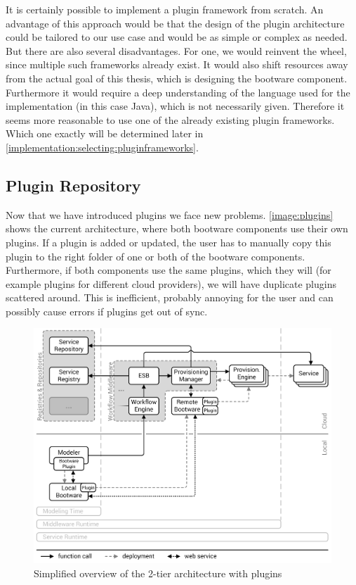 It is certainly possible to implement a plugin framework from scratch.
An advantage of this approach would be that the design of the plugin architecture could be tailored to our use case and would be as simple or complex as needed.
But there are also several disadvantages.
For one, we would reinvent the wheel, since multiple such frameworks already exist.
It would also shift resources away from the actual goal of this thesis, which is designing the bootware component.
Furthermore it would require a deep understanding of the language used for the implementation (in this case Java), which is not necessarily given.
Therefore it seems more reasonable to use one of the already existing plugin frameworks.
Which one exactly will be determined later in \autoref{implementation:selecting:pluginframeworks}.

\subsection{Plugin Repository}
\label{design:pluginrepository}

Now that we have introduced plugins we face new problems.
\autoref{image:plugins} shows the current architecture, where both bootware components use their own plugins.
If a plugin is added or updated, the user has to manually copy this plugin to the right folder of one or both of the bootware components.
Furthermore, if both components use the same plugins, which they will (for example plugins for different cloud providers), we will have duplicate plugins scattered around.
This is inefficient, probably annoying for the user and can possibly cause errors if plugins get out of sync.

\begin{figure}[!htbp]
	\centering
	\includegraphics[resolution=600]{design/assets/plugins}
	\caption{Simplified overview of the 2-tier architecture with plugins}
	\label{image:plugins}
\end{figure}


